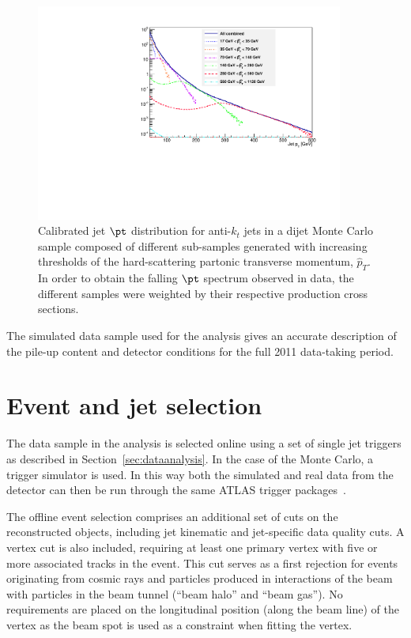 \begin{figure}[tp]
\centering
\includegraphics[width=0.9\textwidth]{JXspectrum.pdf}
\caption{Calibrated jet $\pt$ distribution for anti-$k_t$ jets in a dijet Monte Carlo sample composed of different sub-samples generated with increasing thresholds of the hard-scattering partonic transverse momentum, $\hat{p}_T$. In order to obtain the falling $\pt$ spectrum observed in data, the different samples were weighted by their respective production cross sections.}
\label{fig:JXpt}
\end{figure}




The simulated data sample used for the analysis %
gives an accurate description of the pile-up content and detector conditions for the full 2011 data-taking period. 



\section{Event and jet selection}\label{sec:EventSelection}

The data sample in the analysis is selected online using a set of single jet triggers as described in Section~\ref{sec:dataanalysis}. In the case of the Monte Carlo, a trigger simulator is used. In this way both the simulated and real data from the detector can then be run through the same ATLAS trigger packages~\cite{ATLASTriggerSimulation}.

The offline event selection comprises an additional set of cuts on the reconstructed objects, including jet kinematic and jet-specific data quality cuts. A vertex cut is also included, requiring at least one primary vertex with five or more associated tracks in the event.  This cut serves as a first rejection for events originating from cosmic rays and particles produced in interactions of the beam with particles in the beam tunnel (``beam halo'' and ``beam gas'').
No requirements are placed on the longitudinal position (along the beam line) of the vertex as the beam spot is used as a constraint when fitting the vertex. 



